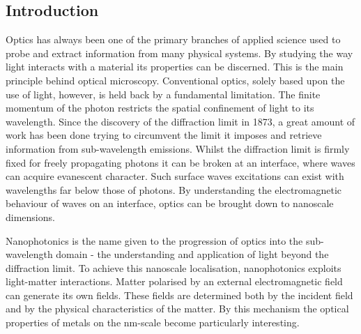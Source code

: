 \documentclass[12pt, a4paper, twoside]{book}
\begin{document}
\begin{singlespace}
\color{white}
\chapter{Introduction}
\end{singlespace}


Optics has always been one of the primary branches of applied science used to probe and extract information from many physical systems. By studying the way light interacts with a material its properties can be discerned. This is the main principle behind optical microscopy. Conventional optics, solely based upon the use of light, {\color{red}however,} is held back by a fundamental limitation. The finite momentum of the photon restricts the spatial confinement of light to its wavelength. Since the discovery of the diffraction limit in 1873, a great amount of work has been done trying to circumvent the limit it imposes and retrieve information from sub-wavelength emissions. Whilst the diffraction limit is firmly fixed for freely propagating photons it can be broken at an interface, where waves can acquire evanescent character. Such surface waves excitations can exist with wavelengths far below those of photons. By understanding the electromagnetic behaviour of waves on an interface, optics can be brought down to nanoscale dimensions.

Nanophotonics is the name given to the progression of optics into the sub-wavelength domain - the understanding and application of light beyond the diffraction limit. To achieve this nanoscale localisation, nanophotonics exploits light-matter interactions. Matter polarised by an external electromagnetic field can generate its own fields. These fields are determined both by the incident field and by the physical characteristics of the matter. By this mechanism the optical properties of metals on the nm-scale become particularly interesting.
\end{document}
